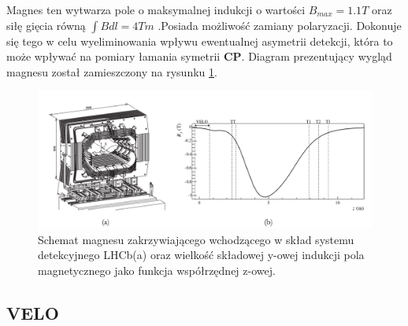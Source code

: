 Magnes ten wytwarza pole o maksymalnej indukcji o wartości $B_{max}=1.1T$ oraz siłę gięcia równą $\int B dl=4Tm$ \cite{magnet}.Posiada możliwość zamiany polaryzacji. Dokonuje się tego w celu wyeliminowania wpływu ewentualnej asymetrii detekcji, która to może wpływać na pomiary łamania symetrii \textbf{CP}. Diagram prezentujący wygląd magnesu został zamieszczony na rysunku \ref{fig:magnes}.
\begin{figure}[!ht]
 \centering
 \includegraphics[scale=0.35]{rozdzial2/magnes.png}
 \caption{Schemat magnesu zakrzywiającego wchodzącego w skład systemu detekcyjnego LHCb(a) oraz wielkość składowej y-owej indukcji pola magnetycznego jako funkcja współrzędnej z-owej.  }
 \label{fig:magnes}
\end{figure}

 


\subsection{VELO}
\label{VELO}

